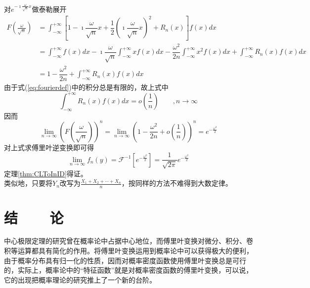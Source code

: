 \documentclass[a4paper]{ctexart}
\begin{document}
    对$e^{-\imath\frac{\omega}{\sqrt{n}}x}$做泰勒展开
    \begin{align}\label{eq:taylor}
      F(\frac{\omega}{\sqrt{n}}) &= \int_{-\infty}^{+\infty} [1 - \imath\dfrac{\omega}{\sqrt{n}}x + \dfrac{1}{2}(\imath\dfrac{\omega}{\sqrt{n}}x)^{2} + R_{n}(x)] f(x)dx \nonumber\\
      &= \int_{-\infty}^{+\infty}f(x)dx - \imath\dfrac{\omega}{\sqrt{n}}\int_{-\infty}^{+\infty}xf(x)dx -  \dfrac{\omega^{2}}{2n}\int_{-\infty}^{+\infty}x^{2}f(x)dx + \int_{-\infty}^{+\infty}R_{n}(x)f(x)dx \nonumber\\
      &= 1-\dfrac{\omega^{2}}{2n} + \int_{-\infty}^{+\infty}R_{n}(x)f(x)dx
    \end{align}
    由于式(\ref{eq:fourierdef})中的积分总是有限的，故上式中
    \begin{equation*}
      \int_{-\infty}^{+\infty}R_{n}(x)f(x)dx=o(\frac{1}{n}) \qquad ,n\to\infty
    \end{equation*}
    因而
    \begin{equation}\label{eq:limit}
      \lim_{n\to\infty}(F(\frac{\omega}{\sqrt{n}}))^{n}
      = \lim_{n\to\infty}(1-\frac{\omega^{2}}{2n}+o(\frac{1}{n}))^{n}
      = e^{-\frac{\omega^{2}}{2}}
    \end{equation}
    对上式求傅里叶逆变换即可得
    \begin{equation}\label{eq:inverse}
      \lim_{n\to\infty}f_{n}(y) = \mathcal{F}^{-1} [e^{-\frac{\omega^{2}}{2}}] = \frac{1}{\sqrt{2\pi}}e^{-\frac{\omega^{2}}{2}}
    \end{equation}
    定理\ref{thm:CLToInID}得证。 \\
    类似地，只要将$Y_{n}$改写为$\frac{X_{1}+X_{2}+\cdots +X_{n}}{n}$，按同样的方法不难得到大数定律。

\section{结~~~~论}

中心极限定理的研究曾在概率论中占据中心地位，而傅里叶变换对微分、积分、卷积等运算都具有简化的作用。将傅里叶变换运用到概率论中可以获得极大的便利，由于概率分布具有归一化的性质，因而对概率密度函数使用傅里叶变换总是可行的，实际上，概率论中的“特征函数”就是对概率密度函数的傅里叶变换，可以说，它的出现把概率理论的研究推上了一个新的台阶。
\end{document}
